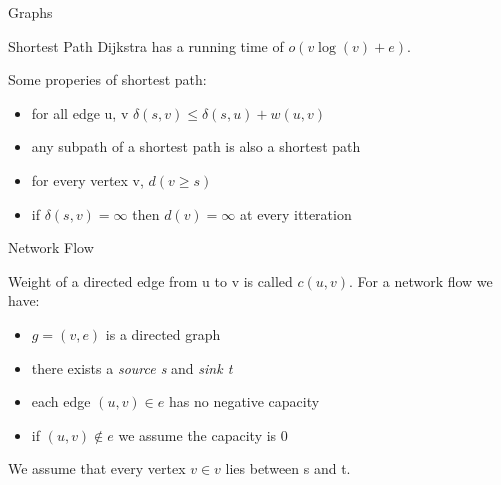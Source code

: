 \documentclass[12pt, letterpaper]{article}
\begin{document}
\begin{section}{Graphs}
\begin{subsection}{Shortest Path}
    Dijkstra has a running time of \(o(v \log(v) + e)\).

    Some properies of shortest path:
    \begin{itemize}
      \item for all edge u, v \(\delta(s, v) \leq \delta(s, u) + w(u, v)\)
      \item any subpath of a shortest path is also a shortest path
      \item for every vertex v, \(d(v \geq s)\)
      \item if \(\delta(s, v) = \infty\) then \(d(v) = \infty\) at every itteration
    \end{itemize}

  \end{subsection}

  \begin{subsection}{Network Flow}

    Weight of a directed edge from u to v is called \(c(u, v)\).
    For a network flow we have:
    \begin{itemize}
      \item \(g = (v, e)\) is a directed graph
      \item there exists a \emph{source s} and \emph{sink t}
      \item each edge \((u, v) \in e\) has no negative capacity
      \item if \((u, v) \notin e\) we assume the capacity is 0
    \end{itemize}
    We assume that every vertex \(v \in v\) lies between s and t.


\end{subsection}
\end{section}
\end{document}
